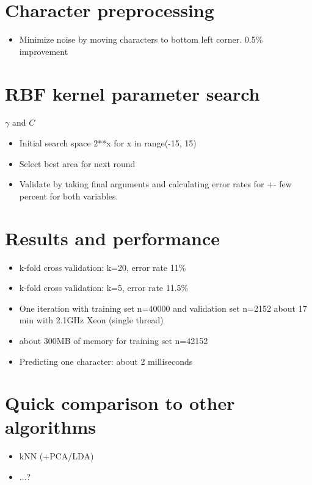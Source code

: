 \documentclass{netsec2012}
\begin{document}
\section{Character preprocessing}

\begin{itemize}
\item Minimize noise by moving characters to bottom left corner. 0.5\% improvement
\end{itemize}

\section{RBF kernel parameter search}

$\gamma$ and $C$

\begin{itemize}
\item Initial search space 2**x for x in range(-15, 15)
\item Select best area for next round
\item Validate by taking final arguments and calculating error rates for +- few percent for both variables.
\end{itemize}

\section{Results and performance}

\begin{itemize}
\item k-fold cross validation: k=20, error rate 11\%
\item k-fold cross validation: k=5, error rate 11.5\%
\item One iteration with training set n=40000 and validation set n=2152 about 17 min with 2.1GHz Xeon (single thread)
\item about 300MB of memory for training set n=42152
\item Predicting one character: about 2 milliseconds

\end{itemize}

\section{Quick comparison to other algorithms}

\begin{itemize}
\item kNN (+PCA/LDA)
\item ...?
\end{itemize}


\cite{albanese12mlpy}



\end{document}
